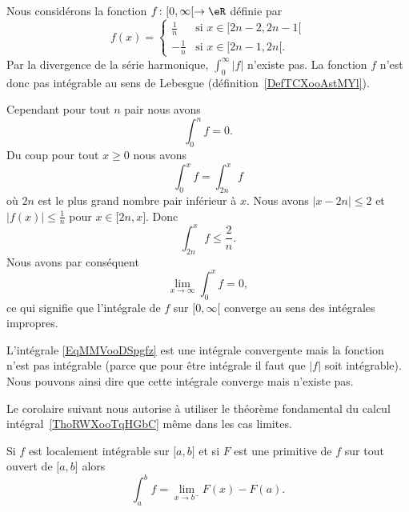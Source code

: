 \begin{example}
	Nous considérons la fonction \( f\colon \mathopen[ 0 , \infty [\to \eR\) définie par
	\begin{equation}
		f(x)=\begin{cases}
			\frac{1}{ n }  & \text{si } x\in\mathopen[ 2n-2 , 2n-1 [       \\
			-\frac{1}{ n } & \text{si } x\in\mathopen[ 2n-1 , 2n [\text{.}
		\end{cases}
	\end{equation}
	Par la divergence de la série harmonique, \( \int_{0}^{\infty}| f |\) n'existe pas. La fonction \( f\) n'est donc pas intégrable au sens de Lebesgue (définition~\ref{DefTCXooAstMYl}).

	Cependant pour tout \( n\) pair nous avons
	\begin{equation}
		\int_0^nf=0.
	\end{equation}
	Du coup pour tout \( x\geq 0\) nous avons
	\begin{equation}
		\int_0^xf=\int_{2n}^xf
	\end{equation}
	où \( 2n\) est le plus grand nombre pair inférieur à \( x\). Nous avons \( | x-2n |\leq 2\) et \( | f(x) |\leq \frac{1}{ n }\) pour \( x\in\mathopen[ 2n , x \mathclose]\). Donc
	\begin{equation}
		\int_{2n}^xf\leq \frac{ 2 }{ n }.
	\end{equation}
	Nous avons par conséquent
	\begin{equation}
		\lim_{x\to \infty} \int_0^xf=0,
	\end{equation}
	ce qui signifie que l'intégrale de \( f\) sur \( \mathopen[ 0 , \infty [\) converge au sens des intégrales impropres.
\end{example}


L'intégrale \eqref{EqMMVooDSpgfz} est une intégrale convergente mais la fonction n'est pas intégrable (parce que pour être intégrale il faut que \( | f |\) soit intégrable). Nous pouvons ainsi dire que cette intégrale converge mais n'existe pas.

Le corolaire suivant nous autorise à utiliser le théorème fondamental du calcul intégral~\ref{ThoRWXooTqHGbC} même dans les cas limites.
\begin{corollary}   \label{CorMUIooXREleR}
	Si \( f\) est localement intégrable sur \( \mathopen[ a , b \mathclose]\) et si \( F\) est une primitive de \( f\) sur tout ouvert de \( \mathopen[ a , b \mathclose]\) alors
	\begin{equation}
		\int_a^bf=\lim_{x\to b^-} F(x)-F(a).
	\end{equation}
\end{corollary}

